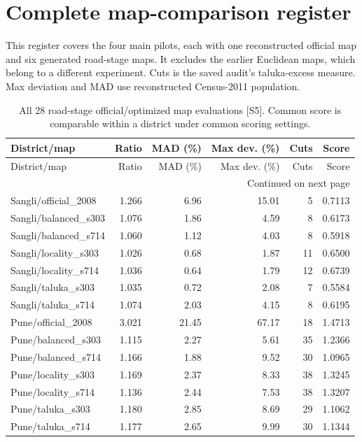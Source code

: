 \documentclass[11pt,a4paper,oneside]{report}
\begin{document}
\chapter{Complete map-comparison register}\label{app:maps}
This register covers the four main pilots, each with one reconstructed official map and six generated road-stage maps. It excludes the earlier Euclidean maps, which belong to a different experiment. Cuts is the saved audit's taluka-excess measure. Max deviation and MAD use reconstructed Census-2011 population.
\begin{center}
\small
\setlength{\tabcolsep}{5pt}
\begin{longtable}{p{5.4cm}rrrrr}
\caption{All 28 road-stage official/optimized map evaluations [S5]. Common score is comparable within a district under common scoring settings.}\\
\toprule
District/map & Ratio & MAD (\%) & Max dev. (\%) & Cuts & Score\\
\midrule\endfirsthead
\toprule
District/map & Ratio & MAD (\%) & Max dev. (\%) & Cuts & Score\\
\midrule\endhead
\midrule\multicolumn{6}{r}{\footnotesize Continued on next page}\\\endfoot
\bottomrule\endlastfoot
Sangli/official\_2008 & 1.266 & 6.96 & 15.01 & 5 & 0.7113\\
Sangli/balanced\_s303 & 1.076 & 1.86 & 4.59 & 8 & 0.6173\\
Sangli/balanced\_s714 & 1.060 & 1.12 & 4.03 & 8 & 0.5918\\
Sangli/locality\_s303 & 1.026 & 0.68 & 1.87 & 11 & 0.6500\\
Sangli/locality\_s714 & 1.036 & 0.64 & 1.79 & 12 & 0.6739\\
Sangli/taluka\_s303 & 1.035 & 0.72 & 2.08 & 7 & 0.5584\\
Sangli/taluka\_s714 & 1.074 & 2.03 & 4.15 & 8 & 0.6195\\
Pune/official\_2008 & 3.021 & 21.45 & 67.17 & 18 & 1.4713\\
Pune/balanced\_s303 & 1.115 & 2.27 & 5.61 & 35 & 1.2366\\
Pune/balanced\_s714 & 1.166 & 1.88 & 9.52 & 30 & 1.0965\\
Pune/locality\_s303 & 1.169 & 2.37 & 8.33 & 38 & 1.3245\\
Pune/locality\_s714 & 1.136 & 2.44 & 7.53 & 38 & 1.3207\\
Pune/taluka\_s303 & 1.180 & 2.85 & 8.69 & 29 & 1.1062\\
Pune/taluka\_s714 & 1.177 & 2.65 & 9.99 & 30 & 1.1344\\

\end{longtable}
\end{center}
\end{document}
